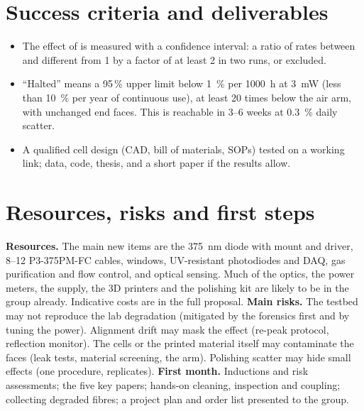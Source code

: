 \section*{Success criteria and deliverables}
\begin{itemize}
  \item The effect of \Oxy{} is measured with a confidence interval: a ratio of rates between  and
         different from 1 by a factor of at least 2 in two runs, or excluded.
  \item ``Halted'' means a 95\,\% upper limit below \SI{1}{\percent} per \SI{1000}{h} at \SI{3}{mW} (less than
        \SI{10}{\percent} per year of continuous use), at least 20 times below the air arm, with unchanged end
        faces. This is reachable in 3--6 weeks at \SI{0.3}{\percent} daily scatter.
  \item A qualified cell design (CAD, bill of materials, SOPs) tested on a working link; data, code,
        thesis, and a short paper if the results allow.
\end{itemize}

\section*{Resources, risks and first steps}
\textbf{Resources.} The main new items are the \SI{375}{nm} diode with mount and driver, 8--12
P3-375PM-FC cables, windows, UV-resistant photodiodes and DAQ, gas purification and flow control, and
optical \Oxy{} sensing. Much of the optics, the power meters, the \Ntwo{} supply, the 3D printers and the
polishing kit are likely to be in the group already. Indicative costs are in the full proposal.
\textbf{Main risks.} The testbed may not reproduce the lab degradation (mitigated by the forensics first
and by tuning the power). Alignment drift may mask the effect (re-peak protocol, reflection monitor). The
cells or the printed material itself may contaminate the faces (leak tests, material screening, the
 arm). Polishing scatter may hide small effects (one procedure, replicates).
\textbf{First month.} Inductions and risk assessments; the five key papers; hands-on cleaning,
inspection and coupling; collecting degraded fibres; a project plan and order list presented to the
group.
